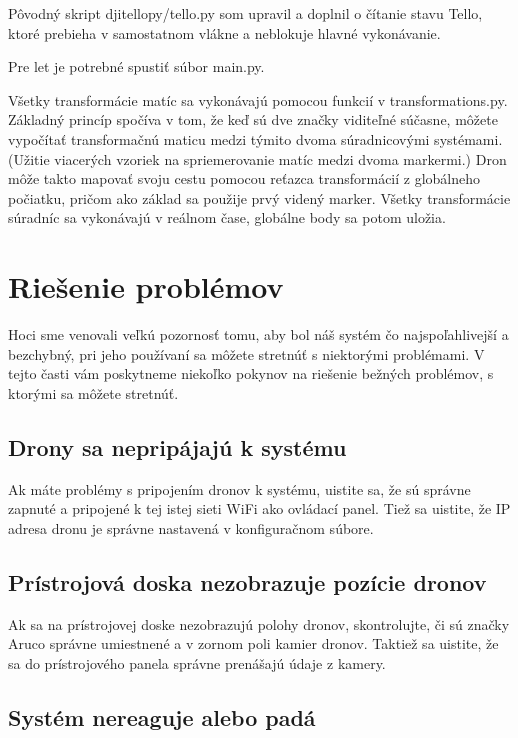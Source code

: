 \documentclass[a4paper]{feidipsp}
\begin{document}
Pôvodný skript djitellopy/tello.py som upravil a doplnil o čítanie stavu Tello, ktoré prebieha v samostatnom vlákne a neblokuje hlavné vykonávanie.

Pre let je potrebné spustiť súbor main.py.

Všetky transformácie matíc sa vykonávajú pomocou funkcií v transformations.py. Základný princíp spočíva v tom, že keď sú dve značky viditeľné súčasne, môžete vypočítať transformačnú maticu medzi týmito dvoma súradnicovými systémami. (Užitie viacerých vzoriek na spriemerovanie matíc medzi dvoma markermi.) Dron môže takto mapovať svoju cestu pomocou reťazca transformácií z globálneho počiatku, pričom ako základ sa použije prvý videný marker. Všetky transformácie súradníc sa vykonávajú v reálnom čase, globálne body sa potom uložia.

\section{Riešenie problémov}

Hoci sme venovali veľkú pozornosť tomu, aby bol náš systém čo najspoľahlivejší a bezchybný, pri jeho používaní sa môžete stretnúť s niektorými problémami. V tejto časti vám poskytneme niekoľko pokynov na riešenie bežných problémov, s ktorými sa môžete stretnúť.

\subsection{Drony sa nepripájajú k systému}

Ak máte problémy s pripojením dronov k systému, uistite sa, že sú správne zapnuté a pripojené k tej istej sieti WiFi ako ovládací panel. Tiež sa uistite, že IP adresa dronu je správne nastavená v konfiguračnom súbore.

\subsection{Prístrojová doska nezobrazuje pozície dronov}

Ak sa na prístrojovej doske nezobrazujú polohy dronov, skontrolujte, či sú značky Aruco správne umiestnené a v zornom poli kamier dronov. Taktiež sa uistite, že sa do prístrojového panela správne prenášajú údaje z kamery.

\subsection{Systém nereaguje alebo padá}
\end{document}
